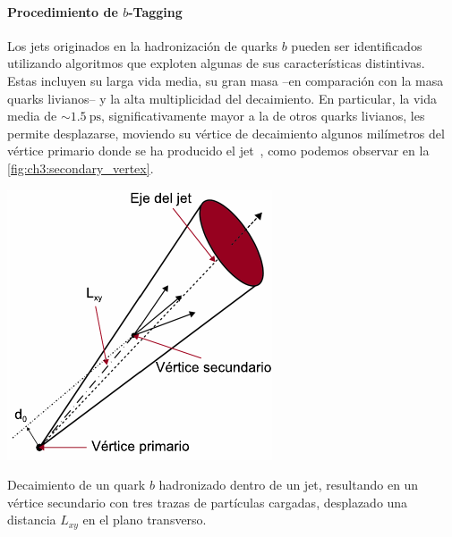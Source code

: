 \paragraph{Procedimiento de $b$-Tagging}

Los jets originados en la hadronización de quarks $b$ pueden ser identificados utilizando algoritmos que exploten algunas de sus características distintivas. Estas incluyen su larga vida media, su gran masa --en comparación con la masa quarks livianos-- y la alta multiplicidad del decaimiento. En particular, la vida media de $\sim \SI{1.5}{\pico\second}$, significativamente mayor a la de otros quarks livianos, les permite desplazarse, moviendo su vértice de decaimiento algunos milímetros del vértice primario donde se ha producido el jet~\cite{ATL-PHYS-PUB-2017-013, ATL-PHYS-PUB-2014-014}, como podemos observar en la \cref{fig:ch3:secondary_vertex}.

\begin{marginfigure}
    \includegraphics[width=\linewidth]{Assets/Images/secondary_vertex.pdf}
    \caption{Decaimiento de un quark $b$ hadronizado dentro de un jet, resultando en un vértice secundario con tres trazas de partículas cargadas, desplazado una distancia $L_{xy}$ en el plano transverso.}
    \label{fig:ch3:secondary_vertex}
\end{marginfigure}

